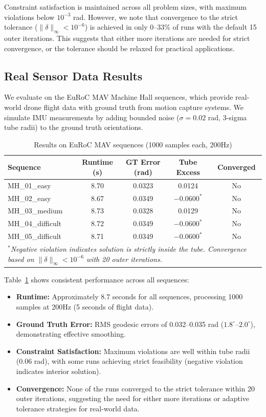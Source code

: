 Constraint satisfaction is maintained across all problem sizes, with maximum violations below $10^{-3}$ rad. However, we note that convergence to the strict tolerance ($\|\delta\|_\infty < 10^{-6}$) is achieved in only 0--33\% of runs with the default 15 outer iterations. This suggests that either more iterations are needed for strict convergence, or the tolerance should be relaxed for practical applications.

\subsection{Real Sensor Data Results}

We evaluate on the EuRoC MAV Machine Hall sequences, which provide real-world drone flight data with ground truth from motion capture systems. We simulate IMU measurements by adding bounded noise ($\sigma = 0.02$ rad, 3-sigma tube radii) to the ground truth orientations.

\begin{table}[htbp]
\centering
\caption{Results on EuRoC MAV sequences (1000 samples each, 200Hz)}
\label{tab:euroc_real}
\begin{tabular}{l c c c c}
\hline
\textbf{Sequence} & \textbf{Runtime (s)} & \textbf{GT Error (rad)} & \textbf{Tube Excess} & \textbf{Converged} \\
\hline
MH\_01\_easy & 8.70 & 0.0323 & 0.0124 & No \\
MH\_02\_easy & 8.67 & 0.0349 & $-0.0600^*$ & No \\
MH\_03\_medium & 8.73 & 0.0328 & 0.0129 & No \\
MH\_04\_difficult & 8.72 & 0.0349 & $-0.0600^*$ & No \\
MH\_05\_difficult & 8.71 & 0.0349 & $-0.0600^*$ & No \\
\hline
\multicolumn{5}{l}{\textit{$^*$Negative violation indicates solution is strictly inside the tube. Convergence based on $\|\delta\|_\infty < 10^{-6}$ with 20 outer iterations.}}
\end{tabular}
\end{table}

Table~\ref{tab:euroc_real} shows consistent performance across all sequences:

\begin{itemize}
\item \textbf{Runtime:} Approximately 8.7 seconds for all sequences, processing 1000 samples at 200Hz (5 seconds of flight data).
\item \textbf{Ground Truth Error:} RMS geodesic errors of 0.032--0.035 rad ($1.8^\circ$--$2.0^\circ$), demonstrating effective smoothing.
\item \textbf{Constraint Satisfaction:} Maximum violations are well within tube radii (0.06 rad), with some runs achieving strict feasibility (negative violation indicates interior solution).
\item \textbf{Convergence:} None of the runs converged to the strict tolerance within 20 outer iterations, suggesting the need for either more iterations or adaptive tolerance strategies for real-world data.
\end{itemize}

